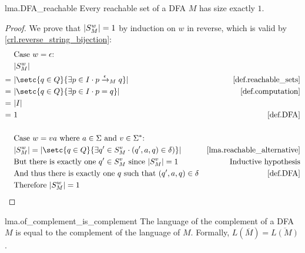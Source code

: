 \documentclass{report}
\DeclarePairedDelimiter{\abs}{\lvert}{\rvert}
\theoremstyle{definition}
\begin{document}
\begin{appendices}
\begin{replemma}{lma.DFA_reachable}
Every reachable set of a DFA $M$ has size exactly $1$.
\end{replemma}

\begin{proof}
We prove that $\abs{S^w_M} = 1$ by induction on $w$ in reverse,
which is valid by \cref{crl.reverse_string_bijection}:
\begin{align*}
& \text{Case } w = \epsilon \text{:} \\
& \abs{S^w_M} \\
= \ & \abs{\setc{q \in Q}{\exists p \in I \cdot p \xrightarrow{\epsilon}_M q}}
& \text{\cref{def.reachable_sets}} \\
= \ & \abs{\setc{q \in Q}{\exists p \in I \cdot p = q}}
& \text{\cref{def.computation}} \\
= \ & \abs{I} \\
= \ & 1 
& \text{\cref{def.DFA}} \\
\\
& \text{Case } w = va \text{ where } a \in \Sigma \text{ and }
v \in \Sigma^{\ast} \text{:} \\
& \abs{S^w_M}
= \abs{\setc{q \in Q}{\exists q' \in S^v_M \cdot (q', a, q) \in \delta)}} 
& \text{\cref{lma.reachable_alternative}} \\
& \text{But there is exactly one } q' \in S^v_M \text{ since } \abs{S^v_M} = 1
& \text{Inductive hypothesis} \\
& \text{And thus there is exactly one } q \text{ such that } (q', a, q) \in \delta
& \text{\cref{def.DFA}} \\
& \text{Therefore } \abs{S^w_M} = 1
\end{align*}
\end{proof}

\begin{replemma}{lma.of_complement_is_complement}
The language of the complement of a DFA $M$ is equal to the complement of the
language of $M$. Formally, $L(\overline{M}) = \overline{L(M)}$.
\end{replemma}


\end{appendices}
\end{document}
